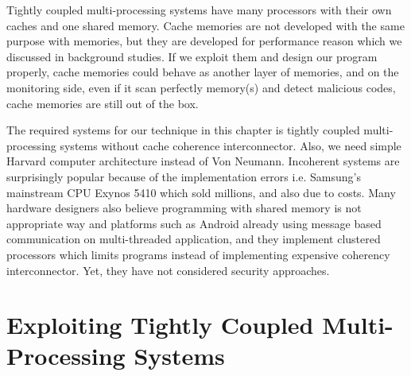Tightly coupled multi-processing systems have many processors with their own caches and one shared memory\cite{Jim2007}. Cache memories are not developed with the same purpose with memories, but they are developed for performance reason which we discussed in background studies. If we exploit them and design our program properly, cache memories could behave as another layer of memories, and on the monitoring side, even if it scan perfectly memory(s) and detect malicious codes, cache memories are still out of the box.

The required systems for our technique in this chapter is tightly coupled multi-processing systems without cache coherence interconnector. Also, we need simple Harvard computer architecture instead of Von Neumann. Incoherent systems are surprisingly popular because of the implementation errors i.e. Samsung's mainstream CPU Exynos 5410 which sold millions, and also due to costs. Many hardware designers also believe programming with shared memory is not appropriate way and platforms such as Android already using message based communication on multi-threaded application, and  they implement clustered processors which limits programs instead of implementing expensive coherency interconnector. Yet, they have not considered security approaches.

	

	\section{Exploiting Tightly Coupled Multi-Processing Systems}
	
